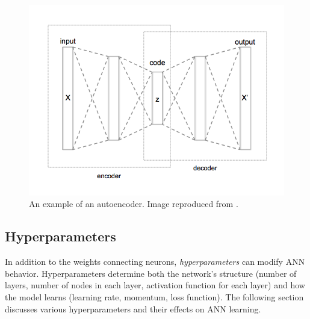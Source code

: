 

\begin{figure}[H]
\centering
\includegraphics[width=0.8\linewidth]{images/Autoencoder_structure}
\caption{An example of an autoencoder. Image reproduced from \cite{wiki:AutoencoderStructure}.}
\label{fig:Autoencoder_structure}
\end{figure}






\subsection{Hyperparameters}

In addition to the weights connecting neurons, \textit{hyperparameters} can modify ANN behavior. Hyperparameters determine both the network's structure (number of layers, number of nodes in each layer, activation function for each layer) and how the model learns (learning rate, momentum, loss function). The following section discusses various hyperparameters and their effects on ANN learning.

